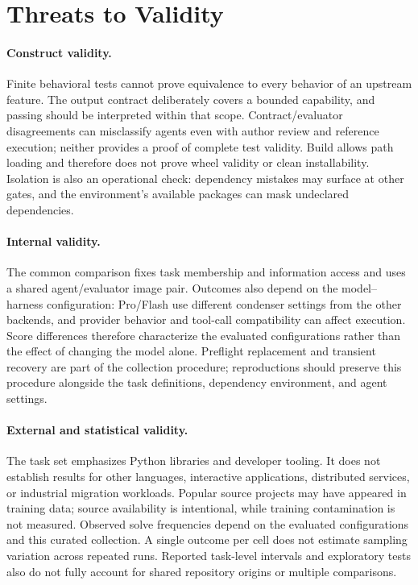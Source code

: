\documentclass[acmsmall,screen,review,anonymous,nonacm]{acmart}
\begin{document}
\section{Threats to Validity}
\label{sec:threats}

\paragraph{Construct validity.}
Finite behavioral tests cannot prove equivalence to every behavior of an upstream
feature. The output contract deliberately covers a bounded capability, and
passing should be interpreted within that scope. Contract/evaluator disagreements can misclassify agents even with author
review and reference execution; neither provides a proof of complete test validity. Build allows path loading
and therefore does not prove wheel validity or clean installability. Isolation
is also an operational check: dependency mistakes may surface at other gates,
and the environment's available packages can mask undeclared dependencies.

\paragraph{Internal validity.}
The common comparison fixes task membership and information access and
uses a shared agent/evaluator image pair. Outcomes also depend on the
model--harness configuration: Pro/Flash use different condenser settings from
the other backends, and provider behavior and tool-call compatibility can
affect execution. Score differences therefore characterize the evaluated
configurations rather than the effect of changing the model alone.
Preflight replacement and transient recovery are part of the collection
procedure; reproductions should preserve this procedure alongside the task
definitions, dependency environment, and agent settings.

\paragraph{External and statistical validity.}
The task set emphasizes Python libraries and developer tooling. It does not
establish results for other languages, interactive applications, distributed
services, or industrial migration workloads. Popular source projects may have
appeared in training data; source availability is intentional, while training
contamination is not measured. Observed solve frequencies depend on the
evaluated configurations and this curated collection. A single outcome per cell
does not estimate sampling variation across repeated runs. Reported task-level
intervals and exploratory tests also do not fully account for shared repository
origins or multiple comparisons.
\end{document}
